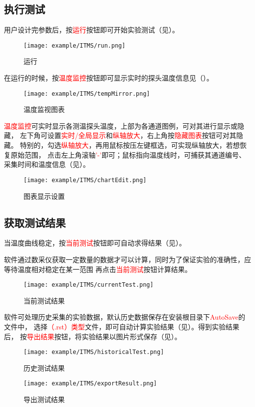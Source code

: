 \subsection{执行测试}
用户设计完参数后，按\textcolor{red}{运行}按钮即可开始实验测试（见）。
\begin{figure}[H]
	\centering
	\texttt{[image: example/ITMS/run.png]}
	\caption{ 运行 \label{fig:exmp_itms_run}}
\end{figure}
在运行的时候，按\textcolor{red}{温度监控}按钮即可显示实时的探头温度信息见（）。
\begin{figure}[H]
	\centering
	\texttt{[image: example/ITMS/tempMirror.png]}
	\caption{ 温度监视图表 \label{fig:exmp_itms_tempMirror}}
\end{figure}
\textcolor{red}{温度监控}可实时显示各测温探头温度，上部为各通道图例，可对其进行显示或隐藏，
左下角可设置\textcolor{red}{实时/全局显示}和\textcolor{red}{纵轴放大}，右上角按\textcolor{red}{隐藏图表}按钮可对其隐藏。
特别的，勾选\textcolor{red}{纵轴放大}，再用鼠标按压左键框选，可实现纵轴放大，若想恢复原始范围，
点击左上角滚轴\textcolor{red}{'-'}即可；鼠标指向温度线时，可捕获其通道编号、采集时间和温度信息（见）。\\
\begin{figure}[H]
	\centering
	\texttt{[image: example/ITMS/chartEdit.png]}
	\caption{ 图表显示设置 \label{fig:exmp_itms_chartEdit}}
\end{figure}

\subsection{获取测试结果}
	当温度曲线稳定，按\textcolor{red}{当前测试}按钮即可自动求得结果（见）。
\begin{note}
	软件通过数采仪获取一定数量的数据才可以计算，同时为了保证实验的准确性，应等待温度相对稳定在某一范围
再点击\textcolor{red}{当前测试}按钮计算结果。
\end{note}
\begin{figure}[H]
	\centering
	\texttt{[image: example/ITMS/currentTest.png]}
	\caption{ 当前测试结果 \label{fig:exmp_itms_currentTest}}
\end{figure}
软件可处理历史采集的实验数据，默认历史数据保存在安装根目录下\textcolor{red}{AutoSave}的文件中，
选择\textcolor{red}{（.rst）类型}文件，即可自动计算实验结果（见）。得到实验结果后，
按\textcolor{red}{导出结果}按钮，将实验结果以图片形式保存（见）。
\begin{figure}[H]
	\centering
	\texttt{[image: example/ITMS/historicalTest.png]}
	\caption{ 历史测试结果 \label{fig:exmp_itms_historicalTest}}
\end{figure}

\begin{figure}[H]
	\centering
	\texttt{[image: example/ITMS/exportResult.png]}
	\caption{ 导出测试结果 \label{fig:exmp_itms_exportResult}}
\end{figure}